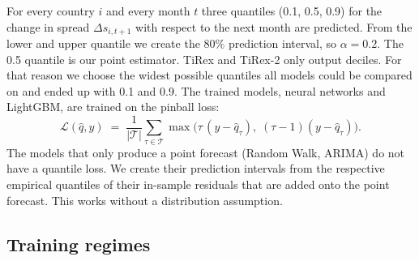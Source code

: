 For every country $i$ and every month $t$ three quantiles (0.1, 0.5, 0.9) for the change in spread $\Delta s_{i,t+1}$ with respect to the next month are predicted.
From the lower and upper quantile we create the 80$\%$ prediction interval, so $\alpha = 0.2$. The 0.5 quantile is our point estimator. TiRex and TiRex-2 only output deciles. For that reason we choose the widest possible quantiles all models could be compared on and ended up with 0.1 and 0.9. The trained models, neural networks and LightGBM, are trained on the pinball loss:
\begin{equation}
  \mathcal{L}(\hat{q}, y) \;=\;
  \frac{1}{|\mathcal{T}|}\sum_{\tau \in \mathcal{T}}
  \max\!\big(\tau\,(y - \hat{q}_\tau),\; (\tau - 1)(y - \hat{q}_\tau)\big).
  \label{eq:pinball}
\end{equation}
The models that only produce a point forecast (Random Walk, ARIMA) do not have a quantile loss. We create their prediction intervals from the respective empirical quantiles of their in-sample residuals that are added onto the point forecast. This works without a distribution assumption.

\subsection{Training regimes}
\label{sec:exp:regimes}


